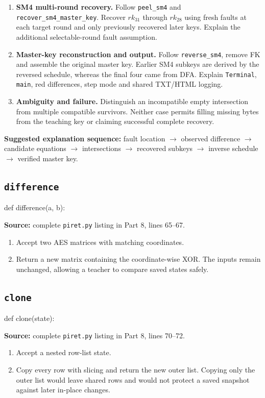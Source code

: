 \begin{enumerate}
\item \textbf{SM4 multi-round recovery.} Follow \texttt{peel\_sm4} and \texttt{recover\_sm4\_master\_key}. Recover $rk_{31}$ through $rk_{28}$ using fresh faults at each target round and only previously recovered later keys. Explain the additional selectable-round fault assumption.
\item \textbf{Master-key reconstruction and output.} Follow \texttt{reverse\_sm4}, remove FK and assemble the original master key. Earlier SM4 subkeys are derived by the reversed schedule, whereas the final four came from DFA. Explain \texttt{Terminal}, \texttt{main}, red differences, step mode and shared TXT/HTML logging.
\item \textbf{Ambiguity and failure.} Distinguish an incompatible empty intersection from multiple compatible survivors. Neither case permits filling missing bytes from the teaching key or claiming successful complete recovery.
\end{enumerate}
\noindent\textbf{Suggested explanation sequence:} fault location $\rightarrow$ observed difference $\rightarrow$ candidate equations $\rightarrow$ intersections $\rightarrow$ recovered subkeys $\rightarrow$ inverse schedule $\rightarrow$ verified master key.

\subsection{\texttt{difference}}
\begin{lightcode}
def difference(a, b):
\end{lightcode}
\noindent\textbf{Source:} complete \texttt{piret.py} listing in Part 8, lines 65--67.
\begin{enumerate}
\item Accept two AES matrices with matching coordinates.
\item Return a new matrix containing the coordinate-wise XOR. The inputs remain unchanged, allowing a teacher to compare saved states safely.
\end{enumerate}
\subsection{\texttt{clone}}
\begin{lightcode}
def clone(state):
\end{lightcode}
\noindent\textbf{Source:} complete \texttt{piret.py} listing in Part 8, lines 70--72.
\begin{enumerate}
\item Accept a nested row-list state.
\item Copy every row with slicing and return the new outer list. Copying only the outer list would leave shared rows and would not protect a saved snapshot against later in-place changes.
\end{enumerate}
